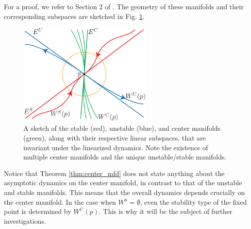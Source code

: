 For a proof, we refer to Section 2 of \cite{marsden_hopf_1976}. The geometry of these manifolds and their corresponding subspaces are sketched in Fig. \ref{fig:mfds_def}.
\begin{figure}[h!]
	\centering
	\includegraphics[width=0.6\textwidth]{figures/ch3/1manifolds_def.pdf}
	\caption{A sketch of the stable (red), unstable (blue), and center manifolds (green), along with their respective linear subspaces, that are invariant under the linearized dynamics. Note the existence of multiple center manifolds and the unique unstable/stable manifolds.}
	\label{fig:mfds_def}
\end{figure}

Notice that Theorem \ref{thm:center_mfd} does not state anything  about the asymptotic dynamics on the center manifold, in contrast to that of the unstable and stable manifolds. This means that the overall dynamics depends crucially on the center manifold. In the case when $W^u=\emptyset$, even the stability type of the fixed point is determined by $W^C(p)$. This is why it will be the subject of further investigations.

